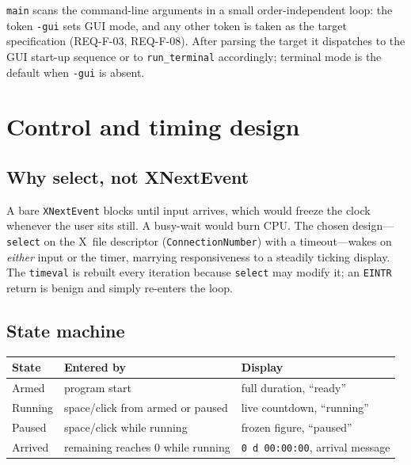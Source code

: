\documentclass[12pt]{article}
\newcommand{\code}[1]{\texttt{#1}}
\begin{document}
\code{main} scans the command-line arguments in a small order-independent
loop: the token \code{-gui} sets GUI mode, and any other token is taken as
the target specification (REQ-F-03, REQ-F-08).  After parsing the target it
dispatches to the GUI start-up sequence or to \code{run\_terminal}
accordingly; terminal mode is the default when \code{-gui} is absent.

\section{Control and timing design}

\subsection{Why select, not XNextEvent}

A bare \code{XNextEvent} blocks until input arrives, which would freeze the
clock whenever the user sits still.  A busy-wait would burn CPU.  The
chosen design---\code{select} on the X~file descriptor
(\code{ConnectionNumber}) with a timeout---wakes on \emph{either} input or
the timer, marrying responsiveness to a steadily ticking display.  The
\code{timeval} is rebuilt every iteration because \code{select} may modify
it; an \code{EINTR} return is benign and simply re-enters the loop.

\subsection{State machine}

\begin{longtable}{p{}p{}p{}}
\toprule
\textbf{State} & \textbf{Entered by} & \textbf{Display} \\
\midrule
Armed & program start & full duration, ``ready'' \\
Running & space/click from armed or paused & live countdown, ``running'' \\
Paused & space/click while running & frozen figure, ``paused'' \\
Arrived & remaining reaches 0 while running & \code{0 d 00:00:00}, arrival message \\
\bottomrule
\end{longtable}

\end{document}
